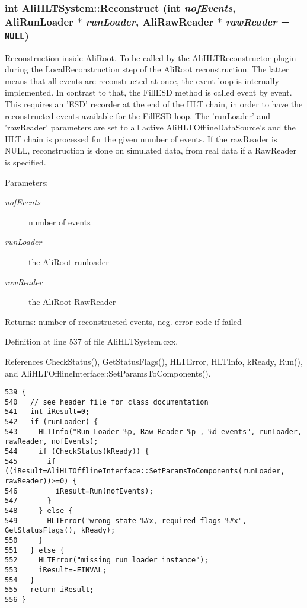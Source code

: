 \subsubsection{\setlength{\rightskip}{0pt plus 5cm}int Ali\-HLTSystem::Reconstruct (int {\em nof\-Events}, Ali\-Run\-Loader $\ast$ {\em run\-Loader}, Ali\-Raw\-Reader $\ast$ {\em raw\-Reader} = {\tt NULL})}\label{classAliHLTSystem_a20}


Reconstruction inside Ali\-Root. To be called by the Ali\-HLTReconstructor plugin during the Local\-Reconstruction step of the Ali\-Root reconstruction. The latter means that all events are reconstructed at once, the event loop is internally implemented. In contrast to that, the Fill\-ESD method is called event by event. This requires an 'ESD' recorder at the end of the HLT chain, in order to have the reconstructed events available for the Fill\-ESD loop. The 'run\-Loader' and 'raw\-Reader' parameters are set to all active Ali\-HLTOffline\-Data\-Source's and the HLT chain is processed for the given number of events. If the raw\-Reader is NULL, reconstruction is done on simulated data, from real data if a Raw\-Reader is specified. \begin{Desc}
\item[Parameters:]
\begin{description}
\item[{\em nof\-Events}]number of events \item[{\em run\-Loader}]the Ali\-Root runloader \item[{\em raw\-Reader}]the Ali\-Root Raw\-Reader \end{description}
\end{Desc}
\begin{Desc}
\item[Returns:]number of reconstructed events, neg. error code if failed \end{Desc}


Definition at line 537 of file Ali\-HLTSystem.cxx.

References Check\-Status(), Get\-Status\-Flags(), HLTError, HLTInfo, k\-Ready, Run(), and Ali\-HLTOffline\-Interface::Set\-Params\-To\-Components().

\footnotesize\begin{verbatim}539 {
540   // see header file for class documentation
541   int iResult=0;
542   if (runLoader) {
543     HLTInfo("Run Loader %p, Raw Reader %p , %d events", runLoader, rawReader, nofEvents);
544     if (CheckStatus(kReady)) {
545       if ((iResult=AliHLTOfflineInterface::SetParamsToComponents(runLoader, rawReader))>=0) {
546         iResult=Run(nofEvents);
547       }
548     } else {
549       HLTError("wrong state %#x, required flags %#x", GetStatusFlags(), kReady);
550     }
551   } else {
552     HLTError("missing run loader instance");
553     iResult=-EINVAL;
554   }
555   return iResult;
556 }
\end{verbatim}\normalsize 


